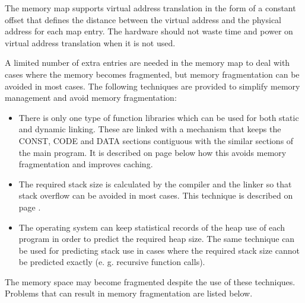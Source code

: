 \documentclass[forwardcom.tex]{subfiles}
\begin{document}
The memory map supports virtual address translation in the form of a constant offset that defines the distance between the virtual address and the physical address for each map entry. The hardware should not waste time and power on virtual address translation when it is not used.
\vv

A limited number of extra entries are needed in the memory map to deal with cases where the memory becomes fragmented, but memory fragmentation can be avoided in most cases. The following techniques are provided to simplify memory management and avoid memory fragmentation:

\begin{itemize}
\item There is only one type of function libraries which can be used for both static and dynamic linking. These are linked with a mechanism that keeps the CONST, CODE and DATA sections contiguous with the similar sections of the main program. It is described on page \pageref{libraryLinkMethods} below how this avoids memory fragmentation and improves caching.

\item The required stack size is calculated by the compiler and the linker so that stack overflow can be avoided in most cases. This technique is described on page \pageref{predictingStackSize}.

\item The operating system can keep statistical records of the heap use of each program in order to predict the required heap size. The same technique can be used for predicting stack use in cases where the required stack size cannot be predicted exactly (e. g. recursive function calls). 
\end{itemize}

The memory space may become fragmented despite the use of these techniques. Problems that can result in memory fragmentation are listed below. 
\end{document}
